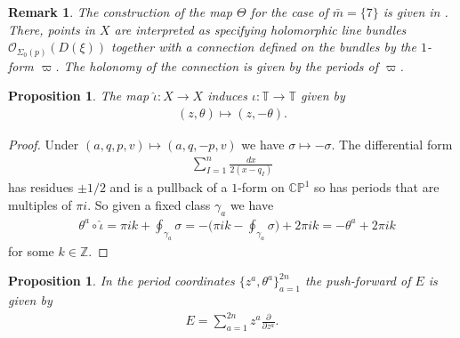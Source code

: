 \documentclass[a4paper,12pt,reqno]{amsart}
\newcounter{counter2}
\numberwithin{equation}{section}
\numberwithin{counter2}{section}
\newcounter{counter3}
\newtheorem{prop}[counter2]{Proposition}
\newtheorem{rem}[counter2]{Remark}
\begin{document}
\begin{rem}
The construction of the map $\Theta$ for the case of $\bar{m} = \{7\}$ is given in \cite{BM}.  There,  points in $X$ are interpreted as specifying holomorphic line bundles $\mathcal{O}_{\Sigma_0(p)}(D(\xi))$ together with a connection defined on the bundles by the $1$-form $\varpi$.  The holonomy of the connection is given by the periods of $\varpi$.  
\end{rem} 
\begin{prop}\label{Involution2}
The map $\hat{\iota}: X \to X$ induces $\iota: \mathbb{T} \to \mathbb{T}$ given by 
\begin{align}
(z,\theta) \mapsto (z,-\theta).  
\end{align}
\end{prop}
\begin{proof}
Under $(a,q,p,v) \mapsto (a,q,-p,v)$ we have $\sigma \mapsto -\sigma$.  The differential form 
\begin{align}
\sum_{I=1}^{n}\frac{dx}{2(x-q_I)}
\end{align}
has residues $\pm 1/2$ and is a pullback of a $1$-form on $\mathbb{CP}^1$ so has periods that are multiples of $\pi i$.  So given a fixed class $\gamma_{a}$ we have
\begin{align}
&\theta^{a} \circ \hat{\iota}  = \pi i k + \oint_{\gamma_{a}} \sigma  = -\bigg(\pi i k - \oint_{\gamma_{a}} \sigma \bigg) + 2\pi i k = -\theta^{a} + 2 \pi i k 
\end{align} 
for some $k \in \mathbb{Z}$.  
\end{proof}
\begin{prop}\label{Euler2}
In the period coordinates $\{z^a,\theta^a\}_{a=1}^{2n}$ the push-forward of $E$ is given by
\begin{align}
E = \sum_{a=1}^{2n} z^a\frac{\partial}{\partial z^a}. 
\end{align}
\end{prop}
\end{document}

